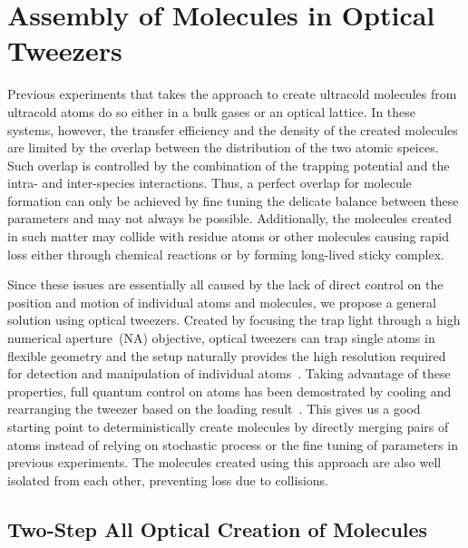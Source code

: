 \section{Assembly of Molecules in Optical Tweezers}
\label{ch:introduction:tweezers}

Previous experiments that takes the approach to create ultracold molecules
from ultracold atoms do so either in a bulk gases or an optical lattice.
In these systems, however, the transfer efficiency and
the density of the created molecules are limited
by the overlap between the distribution of the two atomic speices.
Such overlap is controlled by the combination of the trapping potential
and the intra- and inter-species interactions.
Thus, a perfect overlap for molecule formation can only be achieved by fine tuning
the delicate balance between these parameters and may not always be possible.
Additionally, the molecules created in such matter may collide
with residue atoms or other molecules causing rapid loss
either through chemical reactions or by forming long-lived sticky complex.

Since these issues are essentially all caused by the lack of direct control
on the position and motion of individual atoms and molecules,
we propose a general solution using optical tweezers.
Created by focusing the trap light through a high numerical aperture~(NA) objective,
optical tweezers can trap single atoms in flexible geometry
and the setup naturally provides the high resolution required
for detection and manipulation of individual atoms~\cite{schlosser_sub-poissonian_2001}.
Taking advantage of these properties, full quantum control on atoms has been demostrated
by cooling and rearranging the tweezer based on the loading result~\cite{
  barredo_atom-by-atom_2016,endres_atom-by-atom_2016}.
This gives us a good starting point to deterministically create molecules
by directly merging pairs of atoms instead of
relying on stochastic process or the fine tuning of parameters in previous experiments.
The molecules created using this approach are also well isolated from each other,
preventing loss due to collisions.

\subsection{Two-Step All Optical Creation of Molecules}
\label{ch:introduction:tweezers:two-step}

